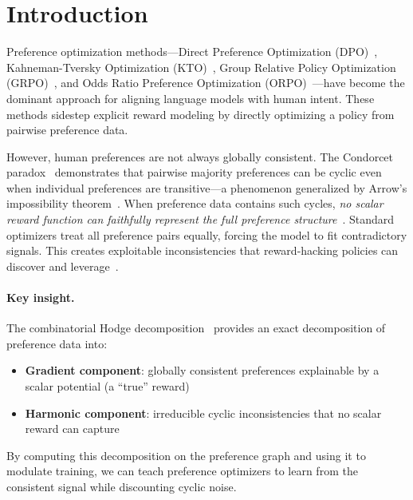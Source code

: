 \documentclass{article}
\begin{document}
\section{Introduction}
\label{sec:intro}

Preference optimization methods---Direct Preference Optimization (DPO)~\citep{rafailov2023direct}, Kahneman-Tversky Optimization (KTO)~\citep{ethayarajh2024kto}, Group Relative Policy Optimization (GRPO)~\citep{shao2024deepseekmath}, and Odds Ratio Preference Optimization (ORPO)~\citep{hong2024orpo}---have become the dominant approach for aligning language models with human intent. These methods sidestep explicit reward modeling by directly optimizing a policy from pairwise preference data.

However, human preferences are not always globally consistent. The Condorcet paradox~\citep{condorcet1785essai} demonstrates that pairwise majority preferences can be cyclic even when individual preferences are transitive---a phenomenon generalized by Arrow's impossibility theorem~\citep{arrow1950difficulty}. When preference data contains such cycles, \emph{no scalar reward function can faithfully represent the full preference structure}~\citep{jiang2011statistical}. Standard optimizers treat all preference pairs equally, forcing the model to fit contradictory signals. This creates exploitable inconsistencies that reward-hacking policies can discover and leverage~\citep{anthropic2025shortcuts, moskovitz2024confronting}.

\paragraph{Key insight.} The combinatorial Hodge decomposition~\citep{hodge1941harmonic, jiang2011statistical} provides an exact decomposition of preference data into:
\begin{itemize}
    \item \textbf{Gradient component}: globally consistent preferences explainable by a scalar potential (a ``true'' reward)
    \item \textbf{Harmonic component}: irreducible cyclic inconsistencies that no scalar reward can capture
\end{itemize}
By computing this decomposition on the preference graph and using it to modulate training, we can teach preference optimizers to learn from the consistent signal while discounting cyclic noise.
\end{document}

